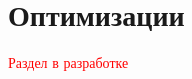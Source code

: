 \documentclass[12pt,twoside]{article}
\newcommand{\fixme}[1]{\textcolor{red}{#1}}
\begin{document}
    \section{Оптимизации}
        \fixme{\Large{Раздел в разработке}}

        
        
        
        
\end{document}
